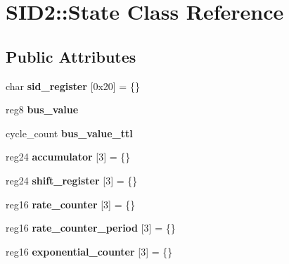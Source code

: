 \hypertarget{classSID2_1_1State}{\section{S\-I\-D2\-:\-:State Class Reference}
\label{classSID2_1_1State}
}
\subsection*{Public Attributes}
\begin{DoxyCompactItemize}
\item 
\hypertarget{classSID2_1_1State_a9d74292782b3c77fef620bb6a516754f}{char {\bfseries sid\-\_\-register} \mbox{[}0x20\mbox{]} = \{\}}\label{classSID2_1_1State_a9d74292782b3c77fef620bb6a516754f}

\item 
\hypertarget{classSID2_1_1State_a54f17008e06f0004c79c23e0c25eb8d4}{reg8 {\bfseries bus\-\_\-value}}\label{classSID2_1_1State_a54f17008e06f0004c79c23e0c25eb8d4}

\item 
\hypertarget{classSID2_1_1State_a981a0880d1004bd3bcb79166e7d9336d}{cycle\-\_\-count {\bfseries bus\-\_\-value\-\_\-ttl}}\label{classSID2_1_1State_a981a0880d1004bd3bcb79166e7d9336d}

\item 
\hypertarget{classSID2_1_1State_afc82c3b5ad86d681f357919b6324ffcc}{reg24 {\bfseries accumulator} \mbox{[}3\mbox{]} = \{\}}\label{classSID2_1_1State_afc82c3b5ad86d681f357919b6324ffcc}

\item 
\hypertarget{classSID2_1_1State_a2edbc2cfc8a7e8a6e4cf0c5983dbb0c5}{reg24 {\bfseries shift\-\_\-register} \mbox{[}3\mbox{]} = \{\}}\label{classSID2_1_1State_a2edbc2cfc8a7e8a6e4cf0c5983dbb0c5}

\item 
\hypertarget{classSID2_1_1State_afd9bdbaf82891f232647ef9e4a08701a}{reg16 {\bfseries rate\-\_\-counter} \mbox{[}3\mbox{]} = \{\}}\label{classSID2_1_1State_afd9bdbaf82891f232647ef9e4a08701a}

\item 
\hypertarget{classSID2_1_1State_a194d00426ddb6f14c2750610bef3f42e}{reg16 {\bfseries rate\-\_\-counter\-\_\-period} \mbox{[}3\mbox{]} = \{\}}\label{classSID2_1_1State_a194d00426ddb6f14c2750610bef3f42e}

\item 
\hypertarget{classSID2_1_1State_a306e1a37cc7eaf948fcfa23ca4ee374e}{reg16 {\bfseries exponential\-\_\-counter} \mbox{[}3\mbox{]} = \{\}}\label{classSID2_1_1State_a306e1a37cc7eaf948fcfa23ca4ee374e}


\end{DoxyCompactItemize}
